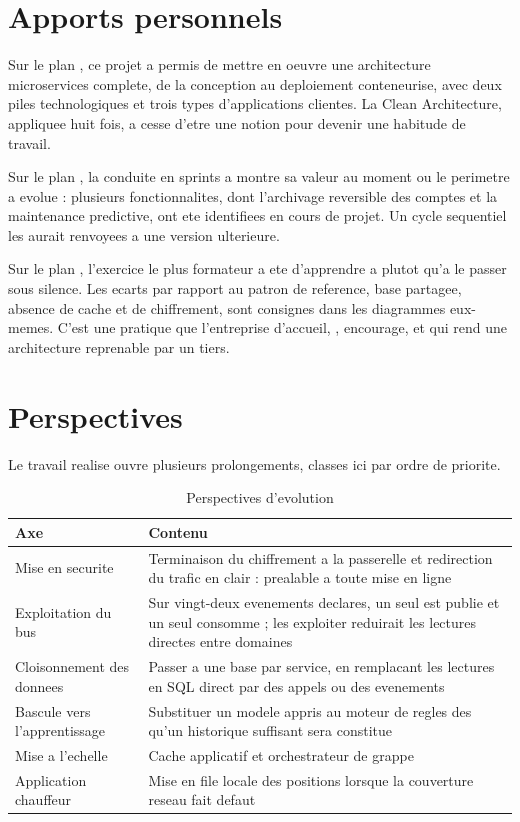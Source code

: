 \section*{Apports personnels}

Sur le plan , ce projet a permis de mettre en oeuvre
une architecture microservices complete, de la conception au deploiement
conteneurise, avec deux piles technologiques et trois types
d'applications clientes. La Clean Architecture, appliquee huit fois, a
cesse d'etre une notion pour devenir une habitude de travail.

Sur le plan , la conduite en sprints a montre
sa valeur au moment ou le perimetre a evolue : plusieurs fonctionnalites,
dont l'archivage reversible des comptes et la maintenance predictive, ont
ete identifiees en cours de projet. Un cycle sequentiel les aurait
renvoyees a une version ulterieure.

Sur le plan , l'exercice le plus formateur a ete
d'apprendre a 
plutot qu'a le passer sous silence. Les ecarts par rapport au patron de
reference, base partagee, absence de cache et de chiffrement, sont
consignes dans les diagrammes eux-memes. C'est une pratique que
l'entreprise d'accueil, \entreprise, encourage, et qui rend une
architecture reprenable par un tiers.

\section*{Perspectives}

Le travail realise ouvre plusieurs prolongements, classes ici par ordre
de priorite.

\begin{table}[H]
\centering
\caption{Perspectives d'evolution}
\label{tab:perspectives}
\small
\begin{tabularx}{\textwidth}{@{}p{3.4cm}X@{}}
\toprule
\textbf{Axe} & \textbf{Contenu} \\ \midrule
Mise en securite & Terminaison du chiffrement a la passerelle et
  redirection du trafic en clair : prealable a toute mise en ligne \\
Exploitation du bus & Sur vingt-deux evenements declares, un seul est
  publie et un seul consomme ; les exploiter reduirait les lectures
  directes entre domaines \\
Cloisonnement des donnees & Passer a une base par service, en remplacant
  les lectures en SQL direct par des appels ou des evenements \\
Bascule vers l'apprentissage & Substituer un modele appris au moteur de
  regles des qu'un historique suffisant sera constitue \\
Mise a l'echelle & Cache applicatif et orchestrateur de grappe \\
Application chauffeur & Mise en file locale des positions lorsque la
  couverture reseau fait defaut \\
\bottomrule
\end{tabularx}
\end{table}

